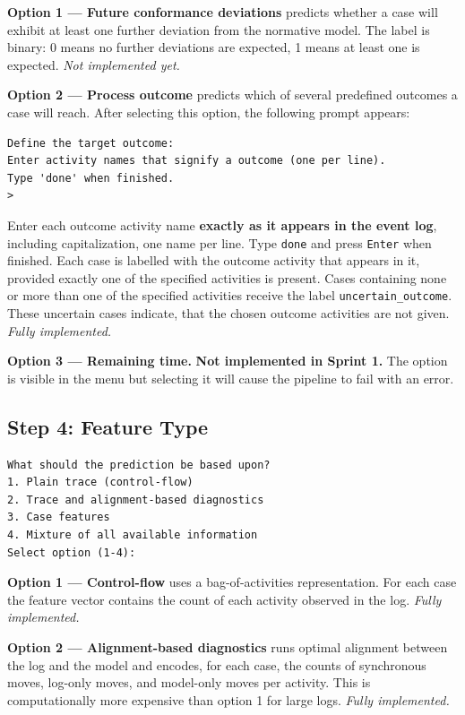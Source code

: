 \documentclass[12pt,a4paper]{article}
\begin{document}
\textbf{Option 1 --- Future conformance deviations} predicts whether a case will exhibit at least one further deviation from the normative model. The label is binary: 0 means no further deviations are expected, 1 means at least one is expected. \textit{Not implemented yet.}

\textbf{Option 2 --- Process outcome} predicts which of several predefined outcomes a case will reach. After selecting this option, the following prompt appears:
\begin{verbatim}
Define the target outcome:
Enter activity names that signify a outcome (one per line).
Type 'done' when finished.
>
\end{verbatim}
Enter each outcome activity name \textbf{exactly as it appears in the event log}, including capitalization, one name per line. Type \texttt{done} and press \texttt{Enter} when finished. Each case is labelled with the outcome activity that appears in it, provided exactly one of the specified activities is present. Cases containing none or more than one of the specified activities receive the label \verb|uncertain_outcome|. These uncertain cases indicate, that the chosen outcome activities are not given. \textit{Fully implemented.}

\textbf{Option 3 --- Remaining time.} \textbf{Not implemented in Sprint 1.} The option is visible in the menu but selecting it will cause the pipeline to fail with an error.

\subsection{Step 4: Feature Type}
\begin{verbatim}
What should the prediction be based upon?
1. Plain trace (control-flow)
2. Trace and alignment-based diagnostics
3. Case features
4. Mixture of all available information
Select option (1-4):
\end{verbatim}

\textbf{Option 1 --- Control-flow} uses a bag-of-activities representation. For each case the feature vector contains the count of each activity observed in the log. \textit{Fully implemented.}

\textbf{Option 2 --- Alignment-based diagnostics} runs optimal alignment between the log and the model and encodes, for each case, the counts of synchronous moves, log-only moves, and model-only moves per activity. This is computationally more expensive than option 1 for large logs. \textit{Fully implemented.}
\end{document}
